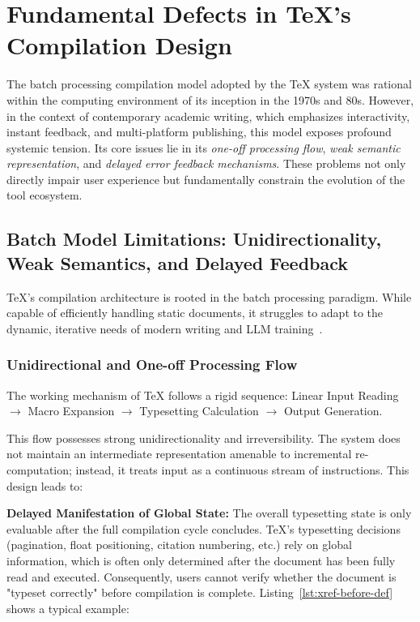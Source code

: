 \section{Fundamental Defects in \TeX{}'s Compilation Design}
\label{sec:fundamental}

The batch processing compilation model adopted by the \TeX{} system was rational within the computing environment of its inception in the 1970s and 80s. However, in the context of contemporary academic writing, which emphasizes interactivity, instant feedback, and multi-platform publishing, this model exposes profound systemic tension. Its core issues lie in its \textit{one-off processing flow}, \textit{weak semantic representation}, and \textit{delayed error feedback mechanisms}. These problems not only directly impair user experience but fundamentally constrain the evolution of the tool ecosystem.

\subsection{Batch Model Limitations: Unidirectionality, Weak Semantics, and Delayed Feedback}

\TeX{}'s compilation architecture is rooted in the batch processing paradigm. While capable of efficiently handling static documents, it struggles to adapt to the dynamic, iterative needs of modern writing and LLM training~\cite{paster2023openwebmath}.

\subsubsection{Unidirectional and One-off Processing Flow}

The working mechanism of \TeX{} follows a rigid sequence: Linear Input Reading $\rightarrow$ Macro Expansion $\rightarrow$ Typesetting Calculation $\rightarrow$ Output Generation.

This flow possesses strong unidirectionality and irreversibility. The system does not maintain an intermediate representation amenable to incremental re-computation; instead, it treats input as a continuous stream of instructions. This design leads to:

\textbf{Delayed Manifestation of Global State:} The overall typesetting state is only evaluable after the full compilation cycle concludes. \TeX{}'s typesetting decisions (pagination, float positioning, citation numbering, etc.) rely on global information, which is often only determined after the document has been fully read and executed. Consequently, users cannot verify whether the document is "typeset correctly" before compilation is complete. Listing~\ref{lst:xref-before-def} shows a typical example:

